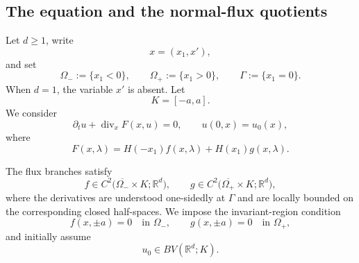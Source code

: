 \documentclass[11pt]{amsart}
\numberwithin{equation}{section}
\theoremstyle{plain}
\theoremstyle{definition}
\theoremstyle{remark}
\begin{document}
\subsection{The equation and the normal-flux quotients}
\label{subsec:flat-setting}

Let \(d\geq1\), write
\[
    x=(x_1,x'),
\]
and set
\[
    \Omega_-:=\{x_1<0\},
    \qquad
    \Omega_+:=\{x_1>0\},
    \qquad
    \Gamma:=\{x_1=0\}.
\]
When \(d=1\), the variable \(x'\) is absent. Let
\[
    K=[-a,a].
\]
We consider
\begin{equation}
\label{eq:flat-main}
    \partial_tu+\operatorname{div}_xF(x,u)=0,
    \qquad
    u(0,x)=u_0(x),
\end{equation}
where
\begin{equation}
\label{eq:flat-piecewise-flux}
    F(x,\lambda)
    =
    H(-x_1)f(x,\lambda)
    +
    H(x_1)g(x,\lambda).
\end{equation}

The flux branches satisfy
\begin{equation}
\label{eq:flat-regularity}
    f\in C^2\bigl(\overline{\Omega_-}\times K;\mathbb R^d\bigr),
    \qquad
    g\in C^2\bigl(\overline{\Omega_+}\times K;\mathbb R^d\bigr),
\end{equation}
where the derivatives are understood one-sidedly at \(\Gamma\) and are locally
bounded on the corresponding closed half-spaces. We impose the
invariant-region condition
\begin{equation}
\label{eq:flat-invariant}
    f(x,\pm a)=0
    \quad\text{in }\Omega_-,
    \qquad
    g(x,\pm a)=0
    \quad\text{in }\Omega_+,
\end{equation}
and initially assume
\begin{equation}
\label{eq:flat-initial-bv}
    u_0\in BV(\mathbb R^d;K).
\end{equation}
\end{document}
